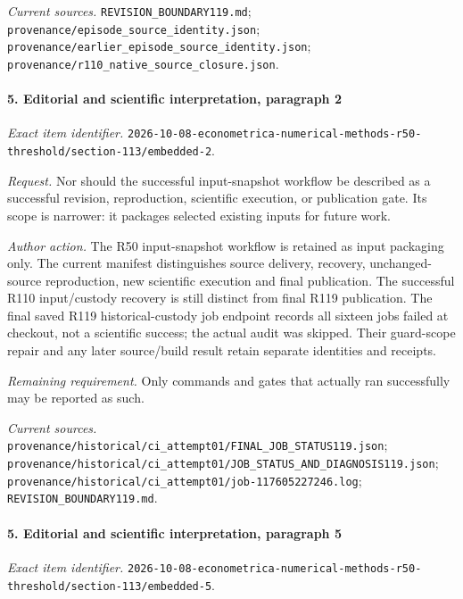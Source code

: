 \par\emph{Current sources.} \nolinkurl{REVISION_BOUNDARY119.md}; \nolinkurl{provenance/episode_source_identity.json}; \nolinkurl{provenance/earlier_episode_source_identity.json}; \nolinkurl{provenance/r110_native_source_closure.json}.

\paragraph{5. Editorial and scientific interpretation, paragraph 2}

\emph{Exact item identifier.} \nolinkurl{2026-10-08-econometrica-numerical-methods-r50-threshold/section-113/embedded-2}.

\par\emph{Request.} Nor should the successful input-snapshot workflow be described as a successful revision, reproduction, scientific execution, or publication gate. Its scope is narrower: it packages selected existing inputs for future work.

\par\emph{Author action.} The R50 input-snapshot workflow is retained as input packaging only. The current manifest distinguishes source delivery, recovery, unchanged-source reproduction, new scientific execution and final publication. The successful R110 input/\allowbreak{}custody recovery is still distinct from final R119 publication. The final saved R119 historical-custody job endpoint records all sixteen jobs failed at checkout, not a scientific success; the actual audit was skipped. Their guard-scope repair and any later source/\allowbreak{}build result retain separate identities and receipts.

\par\emph{Remaining requirement.} Only commands and gates that actually ran successfully may be reported as such.

\par\emph{Current sources.} \nolinkurl{provenance/historical/ci_attempt01/FINAL_JOB_STATUS119.json}; \nolinkurl{provenance/historical/ci_attempt01/JOB_STATUS_AND_DIAGNOSIS119.json}; \nolinkurl{provenance/historical/ci_attempt01/job-117605227246.log}; \nolinkurl{REVISION_BOUNDARY119.md}.

\paragraph{5. Editorial and scientific interpretation, paragraph 5}

\emph{Exact item identifier.} \nolinkurl{2026-10-08-econometrica-numerical-methods-r50-threshold/section-113/embedded-5}.

